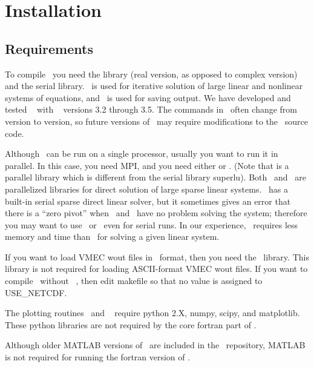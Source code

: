 \chapter{Installation}


\section{Requirements}

To compile \sfincs~you need the \href{http://www.mcs.anl.gov/petsc/}{\PETSc} library (real version, as opposed to complex version) 
and the serial \href{https://www.hdfgroup.org/HDF5/}{\HDF} library.  
\PETSc~is used for iterative solution of large linear and nonlinear systems of equations, and \HDF~is used for saving output.
We have developed and tested \sfincs~ with \PETSc~
versions 3.2 through 3.5.  The commands in \PETSc~often change from version to version, so future versions of \PETSc~may require modifications
to the \sfincs~source code.

Although \sfincs~can be run on a single processor, usually you want to run it in parallel.  
In this case, you need {\ttfamily MPI}, and you need either \href{http://mumps-solver.org/}{\mumps}
or \href{http://crd-legacy.lbl.gov/~xiaoye/SuperLU/}{\superludist}.  (Note that \superludist is a parallel library which is different from the serial library {\ttfamily superlu}).
Both \mumps~and \superludist~are parallelized libraries for direct solution of large sparse linear systems. 
\PETSc~has a built-in serial sparse direct linear solver,
but it sometimes gives an error that there is a ``zero pivot'' when \mumps~and \superludist~have no problem solving the system;
therefore you may want to use \mumps~or \superludist~even for serial runs.  In our experience,
\mumps~requires less memory and time than \superludist~for solving a given linear system.

If you want to load {\ttfamily VMEC wout} files in \netCDF~format, then you need the \netCDF~library.
This library is not required for loading ASCII-format {\ttfamily VMEC wout} files.  If you want to compile \sfincs~without
\netCDF~, then edit {\ttfamily makefile} so that no value is assigned to {\ttfamily USE\_NETCDF}.

The plotting routines \sfincsPlot~and \sfincsScanPlot~ require python 2.X, {\ttfamily numpy}, {\ttfamily scipy}, and {\ttfamily matplotlib}.
These python libraries are not required by the core fortran part of \sfincs.

Although older {\ttfamily MATLAB} versions of \sfincs~are included in the \sfincs~repository,
{\ttfamily MATLAB} is not required for running the fortran version of \sfincs.

